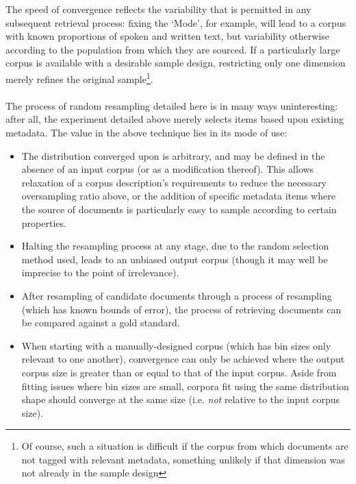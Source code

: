 The speed of convergence reflects the variability that is permitted in any subsequent retrieval process: fixing the `Mode', for example, will lead to a corpus with known proportions of spoken and written text, but variability otherwise according to the population from which they are sourced.  If a particularly large corpus is available with a desirable sample design, restricting only one dimension merely refines the original sample\footnote{Of course, such a situation is difficult if the corpus from which documents are not tagged with relevant metadata, something unlikely if that dimension was not already in the sample design}.

\paragraph{}

The process of random resampling detailed here is in many ways uninteresting: after all, the experiment detailed above merely selects items based upon existing metadata.  The value in the above technique lies in its mode of use:

\begin{itemize}
    \item The distribution converged upon is arbitrary, and may be defined in the absence of an input corpus (or as a modification thereof).  This allows relaxation of a corpus description's requirements to reduce the necessary oversampling ratio above, or the addition of specific metadata items where the source of documents is particularly easy to sample according to certain properties.
    \item Halting the resampling process at any stage, due to the random selection method used, leads to an unbiased output corpus (though it may well be imprecise to the point of irrelevance).
    \item After resampling of candidate documents through a process of resampling (which has known bounds of error), the process of retrieving documents can be compared against a gold standard.
    \item When starting with a manually-designed corpus (which has bin sizes only relevant to one another), convergence can only be achieved where the output corpus size is greater than or equal to that of the input corpus.  Aside from fitting issues where bin sizes are small, corpora fit using the same distribution shape should converge at the same size (i.e. \textsl{not} relative to the input corpus size).

\end{itemize}


